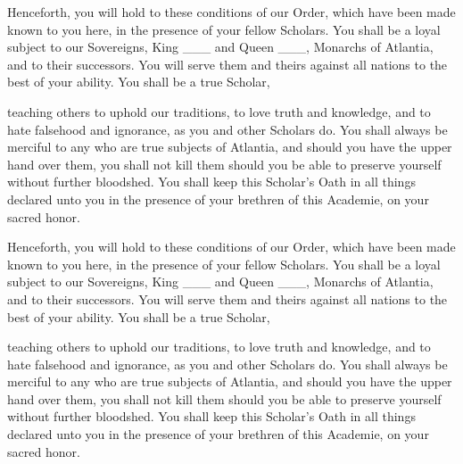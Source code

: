 \documentclass[avery5371,grid]{flashcards}
\begin{document}
\begin{flashcard}{
    \begin{large}
    \begin{minipage}{\cardinnerwidth}
        \normalfont
        Henceforth, you will hold to these conditions of our Order, which have been made known to you here, in the presence of your fellow Scholars.
        You shall be a loyal subject to our Sovereigns, King \_\_\_ and Queen \_\_\_, Monarchs of Atlantia, and to their successors.
        You will serve them and theirs against all nations to the best of your ability.
        You shall be a true Scholar,
    \end{minipage}
    \end{large}
}
\begin{large}
teaching others to uphold our traditions,
to love truth and knowledge, and to hate falsehood and ignorance, as you and other Scholars do.
You shall always be merciful to any who are true subjects of Atlantia, and should you have the upper hand over them, you shall not kill them should you be able to preserve yourself without further bloodshed.
You shall keep this Scholar's Oath in all things declared unto you in the presence of your brethren of this Academie, on your sacred honor.
\end{large}
\end{flashcard}
\begin{flashcard}{
    \begin{large}
    \begin{minipage}{\cardinnerwidth}
        \normalfont
        Henceforth, you will hold to these conditions of our Order, which have been made known to you here, in the presence of your fellow Scholars.
        You shall be a loyal subject to our Sovereigns, King \_\_\_ and Queen \_\_\_, Monarchs of Atlantia, and to their successors.
        You will serve them and theirs against all nations to the best of your ability.
        You shall be a true Scholar,
    \end{minipage}
    \end{large}
}
\begin{large}
teaching others to uphold our traditions,
to love truth and knowledge, and to hate falsehood and ignorance, as you and other Scholars do.
You shall always be merciful to any who are true subjects of Atlantia, and should you have the upper hand over them, you shall not kill them should you be able to preserve yourself without further bloodshed.
You shall keep this Scholar's Oath in all things declared unto you in the presence of your brethren of this Academie, on your sacred honor.
\end{large}
\end{flashcard}
\end{document}
